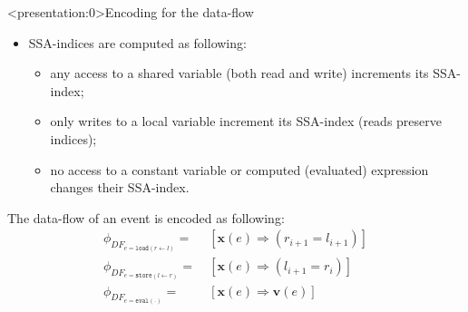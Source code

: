 \documentclass[aspectratio=149]{beamer}
\newcommand*{\fx}{\ensuremath{\mathbf{x}}}%
\newcommand*{\fv}{\ensuremath{\mathbf{v}}} %
\newcommand{\defeq}{\ensuremath{=}}%
\begin{document}
\begin{frame}<presentation:0>{Encoding for the data-flow}
\begin{itemize}
\item SSA-indices are computed as following:
\begin{itemize}
  \item any access to a shared variable (both read and write) increments its SSA-index;
  \item only writes to a local variable increment its SSA-index (reads preserve indices);
  \item no access to a constant variable or computed (evaluated) expression changes their SSA-index.
\end{itemize}
\end{itemize}
The data-flow of an event is encoded as following:
\begin{align}
    \phi_{DF_{e = \texttt{load}(r \leftarrow l)}}  \defeq \ & [\fx(e) \Rightarrow (r_{i+1} = l_{i+1})] \nonumber \\
    \phi_{DF_{e = \texttt{store}(l \leftarrow r)}} \defeq \ & [\fx(e) \Rightarrow (l_{i+1} = r_i)] \nonumber\\
    \phi_{DF_{e = \texttt{eval}(\cdot)}}           \defeq \ & [\fx(e) \Rightarrow \fv(e)] \nonumber \\
\end{align}
\end{frame}
\end{document}
